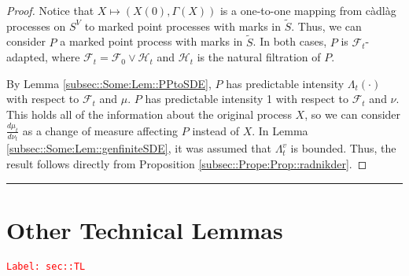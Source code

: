 \documentclass[12pt]{article}
\newcommand{\mc}{\mathcal}
\newcommand{\tr}{\textcolor{red}}
\newcommand{\labe}[1]{\tr{\texttt{Label: #1}}}
\newcommand{\ind}{\hspace{24pt}}
\newcommand{\lin}{\rule{\linewidth}{0.4 pt}}
\renewcommand{\v}{v}							%
\renewcommand{\S}{S}							%
\renewcommand{\t}{t}							%
\newcommand{\F}{\mc{F}}							%
\newcommand{\FH}{\mc{H}}						%
\newcommand{\X}{X}								%
\newcommand{\vind}[1]{^{#1}}					%
\newcommand{\carp}[1]{^{#1}}					%
\newcommand{\tp}[1]{(#1)}						%
\newcommand{\ts}[1]{_{#1}}						%
\newcommand{\alt}[1]{\widetilde{#1}}			%
\newcommand{\m}{\mu}							%
\newcommand{\mm}{\nu}							%
\newcommand{\pmap}{\Gamma}						%
\newcommand{\rp}{P}								%
\newcommand{\ratee}{\Lambda}					%
\begin{document}
\begin{proof}
Notice that \(\X \mapsto (\X\tp{0},\pmap(\X))\) is a one-to-one mapping from c\`adl\`ag processes on \(\S\carp{V}\) to marked point processes with marks in \(\alt{\S}\). Thus, we can consider \(\rp\) a marked point process with marks in \(\alt{\S}\). In both cases, \(\rp\) is \(\F\ts{\t}\)-adapted, where \(\F\ts{\t} = \F\ts{0}\vee \FH\ts{\t}\) and \(\FH\ts{\t}\) is the natural filtration of \(\rp\).

\ind By Lemma \ref{subsec::Some:Lem::PPtoSDE}, \(\rp\) has predictable intensity \(\ratee\ts{\t}(\cdot)\) with respect to \(\F\ts{\t}\) and \(\m\). \(\rp\) has predictable intensity 1 with respect to \(\F\ts{\t}\) and \(\mm\). This holds all of the information about the original process \(\X\), so we can consider \(\frac{d\m\ts{\t}}{d\mm\ts{\t}}\) as a change of measure affecting \(\rp\) instead of \(\X\). In Lemma \ref{subsec::Some:Lem::genfiniteSDE}, it was assumed that \(\ratee\ts{\t}\vind{\v}\) is bounded. Thus, the result follows directly from Proposition \ref{subsec::Prope:Prop::radnikder}. 
\end{proof}

\lin
\section{Other Technical Lemmas}
\label{sec::TL}\labe{sec::TL}
\end{document}
